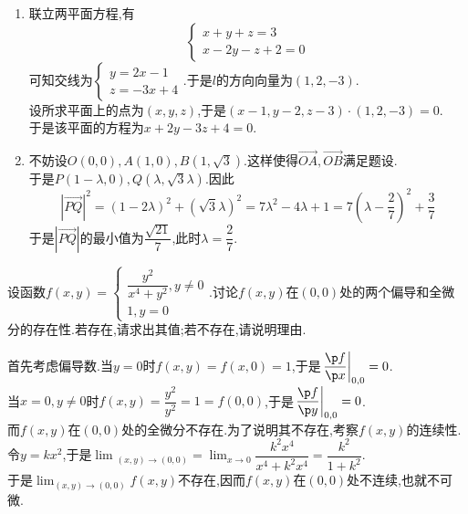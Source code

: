 \documentclass{ctexart}
\begin{document}
\begin{solution}
    \begin{enumerate}[label=\textbf{(\arabic*)},leftmargin=*]
        \item 联立两平面方程,有
            \[\left\{\begin{array}{l}
                x+y+z=3\\x-2y-z+2=0
            \end{array}\right.\]
            可知交线为$\left\{\begin{array}{l}
                y=2x-1\\z=-3x+4
            \end{array}\right.$.于是$l$的方向向量为$(1,2,-3)$.\\
            设所求平面上的点为$(x,y,z)$,于是$(x-1,y-2,z-3)\cdot(1,2,-3)=0$.\\
            于是该平面的方程为$x+2y-3z+4=0$.
        \item 不妨设$O(0,0),A(1,0),B(1,\sqrt{3})$.这样使得$\overrightarrow{OA},\overrightarrow{OB}$满足题设.\\
            于是$P(1-\lambda,0),Q(\lambda,\sqrt{3}\lambda)$.因此
            \[\left|\overrightarrow{PQ}\right|^2=(1-2\lambda)^2+(\sqrt{3}\lambda)^2=7\lambda^2-4\lambda+1=7\left(\lambda-\dfrac{2}{7}\right)^2+\dfrac{3}{7}\]
            于是$\left|\overrightarrow{PQ}\right|$的最小值为$\dfrac{\sqrt{21}}{7}$,此时$\lambda=\dfrac27$.
    \end{enumerate}
\end{solution}
\begin{problem}[4.(10\songti{分})]
    设函数$\displaystyle f(x,y)=\left\{\begin{array}{l}
        \dfrac{y^2}{x^4+y^2},y\neq0\\
        1,y=0
    \end{array}\right.$.讨论$f(x,y)$在$(0,0)$处的两个偏导和全微分的存在性.若存在,请求出其值;若不存在,请说明理由.
\end{problem}
\begin{solution}
    首先考虑偏导数.当$y=0$时$f(x,y)=f(x,0)=1$,于是$\left.\dfrac{\p f}{\p x}\right|_{0,0}=0$.\\
    当$x=0,y\neq 0$时$f(x,y)=\dfrac{y^2}{y^2}=1=f(0,0)$,于是$\left.\dfrac{\p f}{\p y}\right|_{0,0}=0$.\\
    而$f(x,y)$在$(0,0)$处的全微分不存在.为了说明其不存在,考察$f(x,y)$的连续性.\\
    令$y=kx^2$,于是$\lim\displaystyle_{(x,y)\to(0,0)}=\lim_{x\to0}\dfrac{k^2x^4}{x^4+k^2x^4}=\dfrac{k^2}{1+k^2}$.\\
    于是$\displaystyle\lim_{(x,y)\to(0,0)}f(x,y)$不存在,因而$f(x,y)$在$(0,0)$处不连续,也就不可微.
\end{solution}
\end{document}
